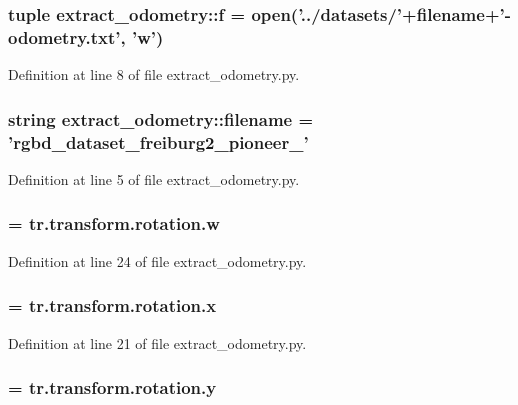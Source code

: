 \subsubsection[{f}]{\setlength{\rightskip}{0pt plus 5cm}tuple {\bf extract\-\_\-odometry\-::f} = open('../datasets/'+{\bf filename}+'-\/odometry.\-txt', 'w')}\label{namespaceextract__odometry_a385e3358d6690ef4a78aa146bc518d50}


\-Definition at line 8 of file extract\-\_\-odometry.\-py.

\subsubsection[{filename}]{\setlength{\rightskip}{0pt plus 5cm}string {\bf extract\-\_\-odometry\-::filename} = 'rgbd\-\_\-dataset\-\_\-freiburg2\-\_\-pioneer\-\_'}\label{namespaceextract__odometry_aca3f1ea94ad804a4035d1e8bee940455}


\-Definition at line 5 of file extract\-\_\-odometry.\-py.

\subsubsection[{qw}]{ = tr.\-transform.\-rotation.\-w}\label{namespaceextract__odometry_a2fcf327e507514edac94eafa6c0d2553}


\-Definition at line 24 of file extract\-\_\-odometry.\-py.

\subsubsection[{qx}]{ = tr.\-transform.\-rotation.\-x}\label{namespaceextract__odometry_a71803a55510681345858a3cc1c6b552d}


\-Definition at line 21 of file extract\-\_\-odometry.\-py.

\subsubsection[{qy}]{ = tr.\-transform.\-rotation.\-y}\label{namespaceextract__odometry_a13eed1823e41e639089daf48b50c2962}


